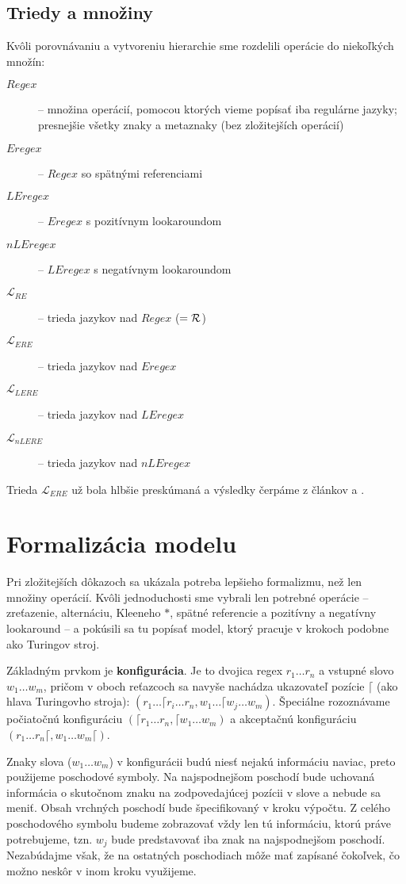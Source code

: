 \documentclass{svk_long_sk}
\def\R{{\cal R}} %
\def\re{Regex}
\def\e{Eregex}
\def\le{LEregex}
\def\nle{nLEregex}
\def\rel{{\mathscr{L}_{RE}}}
\def\el{\mathscr{L}_{ERE}}
\def\lel{\mathscr{L}_{LERE}}
\def\nlel{\mathscr{L}_{nLERE}}
\begin{document}
\subsection{Triedy a množiny}
Kvôli porovnávaniu a vytvoreniu hierarchie sme rozdelili operácie do niekoľkých množín:
\begin{description}
\item[$\re$] -- množina operácií, pomocou ktorých vieme popísať iba regulárne jazyky; presnejšie všetky znaky a metaznaky (bez zložitejších operácií)
\item[$\e$] -- $\re$ so spätnými referenciami
\item[$\le$] -- $\e$ s pozitívnym lookaroundom
\item[$\nle$] -- $\le$ s negatívnym lookaroundom
\item[$\rel$] -- trieda jazykov nad $\re$ ($= \R$)
\item[$\el$] -- trieda jazykov nad $\e$
\item[$\lel$] -- trieda jazykov nad $\le$
\item[$\nlel$] -- trieda jazykov nad $\nle$
\end{description}

Trieda $\el$ už bola hlbšie preskúmaná a výsledky čerpáme z článkov \cite{ExtendedRegexPower} a \cite{ExtendedRegexIntersec}.
 
\section{Formalizácia modelu}
Pri zložitejších dôkazoch sa ukázala potreba lepšieho formalizmu, než len množiny operácií. Kvôli jednoduchosti sme vybrali len potrebné operácie -- zreťazenie, alternáciu, Kleeneho $*$, spätné referencie a pozitívny a negatívny lookaround -- a pokúsili sa tu popísať model, ktorý pracuje v krokoch podobne ako Turingov stroj.

Základným prvkom je \textbf{konfigurácia}. Je to dvojica regex $r_1 \dots r_n$ a vstupné slovo $w_1 \dots w_m$, pričom v oboch reťazcoch sa navyše nachádza ukazovateľ pozície $\lceil$ (ako hlava Turingovho stroja): $(r_1\dots \lceil r_i\dots r_n,w_1 \dots \lceil w_j \dots w_m)$. Špeciálne rozoznávame počiatočnú konfiguráciu $(\lceil r_1 \dots r_n,\lceil w_1 \dots w_m)$ a akceptačnú konfiguráciu $(r_1 \dots r_n \lceil, w_1 \dots w_m \lceil)$.

Znaky slova ($w_1\dots w_m$) v konfigurácii budú niesť nejakú informáciu naviac, preto použijeme poschodové symboly. Na najspodnejšom poschodí bude uchovaná informácia o skutočnom znaku na zodpovedajúcej pozícii v slove a nebude sa meniť. Obsah vrchných poschodí bude špecifikovaný v kroku výpočtu. Z celého poschodového symbolu budeme zobrazovať vždy len tú informáciu, ktorú práve potrebujeme, tzn. $w_j$ bude predstavovať iba znak na najspodnejšom poschodí. Nezabúdajme však, že na ostatných poschodiach môže mať zapísané čokoľvek, čo možno neskôr v inom kroku využijeme.
\end{document}
